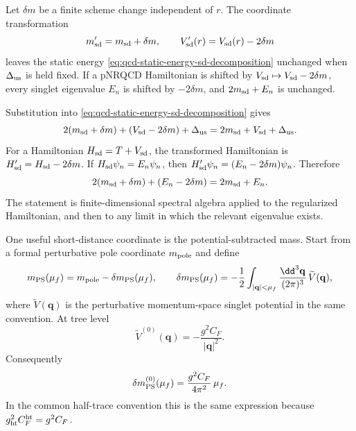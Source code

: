 \begin{remark}
\label{rem:qcd-heavy-mass-potential-shift}
Let \(\delta m\) be a finite scheme change independent of \(r\).  The
coordinate transformation
\begin{equation}
  m_{\rm sd}'=m_{\rm sd}+\delta m,
  \qquad
  V_{\rm sd}'(r)=V_{\rm sd}(r)-2\delta m
  \label{eq:qcd-heavy-mass-potential-shift}
\end{equation}
leaves the static energy \eqref{eq:qcd-static-energy-sd-decomposition}
unchanged when \(\Delta_{\rm us}\) is held fixed.  If a pNRQCD Hamiltonian is
shifted by \(V_{\rm sd}\mapsto V_{\rm sd}-2\delta m\), every singlet
eigenvalue \(E_n\) is shifted by \(-2\delta m\), and
\(2m_{\rm sd}+E_n\) is unchanged.
\par
Substitution into \eqref{eq:qcd-static-energy-sd-decomposition} gives
\[
  2(m_{\rm sd}+\delta m)+(V_{\rm sd}-2\delta m)+\Delta_{\rm us}
  =
  2m_{\rm sd}+V_{\rm sd}+\Delta_{\rm us}.
\]
For a Hamiltonian \(H_{\rm sd}=T+V_{\rm sd}\), the transformed Hamiltonian is
\(H_{\rm sd}'=H_{\rm sd}-2\delta m\).  If
\(H_{\rm sd}\psi_n=E_n\psi_n\), then
\(H_{\rm sd}'\psi_n=(E_n-2\delta m)\psi_n\).  Therefore
\[
  2(m_{\rm sd}+\delta m)+(E_n-2\delta m)=2m_{\rm sd}+E_n .
\]
The statement is finite-dimensional spectral algebra applied to the
regularized Hamiltonian, and then to any limit in which the relevant
eigenvalue exists.
\end{remark}

One useful short-distance coordinate is the potential-subtracted mass.  Start
from a formal perturbative pole coordinate \(m_{\rm pole}\) and define
\begin{equation}
  m_{\rm PS}(\mu_f)
  =
  m_{\rm pole}-\delta m_{\rm PS}(\mu_f),
  \qquad
  \delta m_{\rm PS}(\mu_f)
  =
  -\frac12
  \int_{|\mathbf q|<\mu_f}
  \frac{\dd^3\mathbf q}{(2\pi)^3}\,
  \widetilde V(\mathbf q),
  \label{eq:qcd-ps-mass-definition}
\end{equation}
where \(\widetilde V(\mathbf q)\) is the perturbative momentum-space singlet
potential in the same convention.  At tree level
\[
  \widetilde V^{(0)}(\mathbf q)=-\frac{g^2C_F}{|\mathbf q|^2}.
\]
Consequently
\begin{equation}
  \delta m_{\rm PS}^{(0)}(\mu_f)
  =
  \frac{g^2C_F}{4\pi^2}\,\mu_f .
  \label{eq:qcd-ps-leading-subtraction}
\end{equation}
In the common half-trace convention this is the same expression because
\(g_{\rm ht}^2C_F^{\rm ht}=g^2C_F\).


